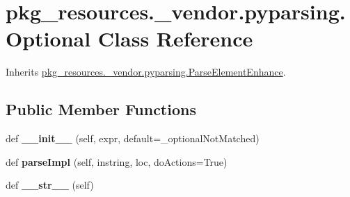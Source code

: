 \hypertarget{classpkg__resources_1_1__vendor_1_1pyparsing_1_1_optional}{}\section{pkg\+\_\+resources.\+\_\+vendor.\+pyparsing.\+Optional Class Reference}
\label{classpkg__resources_1_1__vendor_1_1pyparsing_1_1_optional}


Inherits \hyperlink{classpkg__resources_1_1__vendor_1_1pyparsing_1_1_parse_element_enhance}{pkg\+\_\+resources.\+\_\+vendor.\+pyparsing.\+Parse\+Element\+Enhance}.

\subsection*{Public Member Functions}
\begin{DoxyCompactItemize}
\item 
\mbox{\label{classpkg__resources_1_1__vendor_1_1pyparsing_1_1_optional_a961ba4ed7d732d2e1c2c4ff451a59828}} 
def {\bfseries \+\_\+\+\_\+init\+\_\+\+\_\+} (self, expr, default=\+\_\+optional\+Not\+Matched)
\item 
\mbox{\label{classpkg__resources_1_1__vendor_1_1pyparsing_1_1_optional_a29bcd35d3c4372bee814ce583f27b8d9}} 
def {\bfseries parse\+Impl} (self, instring, loc, do\+Actions=True)
\item 
\mbox{\label{classpkg__resources_1_1__vendor_1_1pyparsing_1_1_optional_a5b76d791b02bd21e12274019877a26e5}} 
def {\bfseries \+\_\+\+\_\+str\+\_\+\+\_\+} (self)
\end{DoxyCompactItemize}
